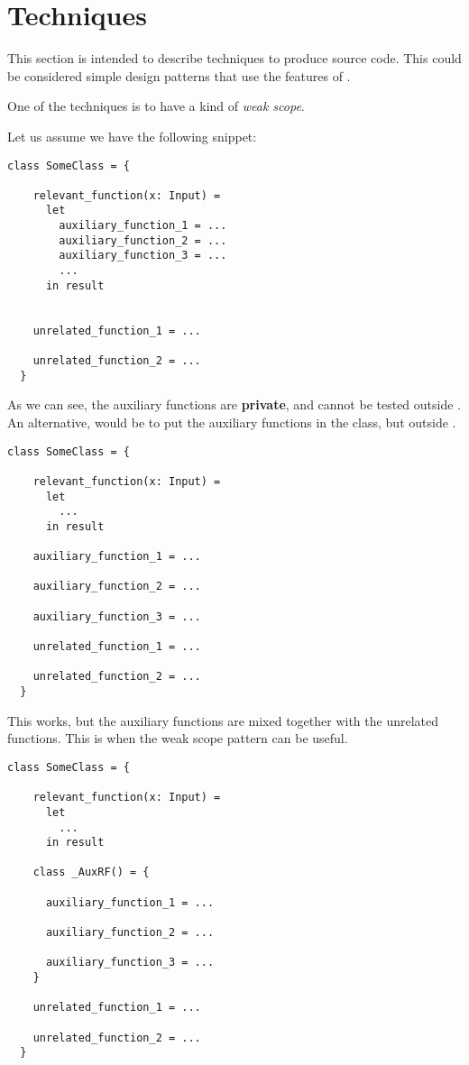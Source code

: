 \section{Techniques}

This section is intended to describe techniques to produce \Soda source code.
This could be considered simple design patterns that use the features of \Soda.

One of the techniques is to have a kind of \textit{weak scope}.

Let us assume we have the following snippet:
\begin{lstlisting}[label={lst:techniquesWeakScope0}]
  class SomeClass = {

    relevant_function(x: Input) =
      let
        auxiliary_function_1 = ...
        auxiliary_function_2 = ...
        auxiliary_function_3 = ...
        ...
      in result


    unrelated_function_1 = ...

    unrelated_function_2 = ...
  }
\end{lstlisting}

As we can see, the auxiliary functions are \textbf{private}, and cannot be tested outside .
An alternative, would be to put the auxiliary functions in the class, but outside .

\begin{lstlisting}[label={lst:techniquesWeakScope1}]
  class SomeClass = {

    relevant_function(x: Input) =
      let
        ...
      in result

    auxiliary_function_1 = ...

    auxiliary_function_2 = ...

    auxiliary_function_3 = ...

    unrelated_function_1 = ...

    unrelated_function_2 = ...
  }
\end{lstlisting}

This works, but the auxiliary functions are mixed together with the unrelated functions.
This is when the weak scope pattern can be useful.

\begin{lstlisting}[label={lst:techniquesWeakScope2}]
  class SomeClass = {

    relevant_function(x: Input) =
      let
        ...
      in result

    class _AuxRF() = {

      auxiliary_function_1 = ...

      auxiliary_function_2 = ...

      auxiliary_function_3 = ...
    }

    unrelated_function_1 = ...

    unrelated_function_2 = ...
  }
\end{lstlisting}

